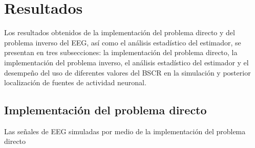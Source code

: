 %
\chapter{Resultados}
\label{sec:results}

Los resultados obtenidos de la implementación del problema directo y del problema inverso del EEG, así como el análisis estadístico del estimador, se presentan en tres subsecciones: la implementación del problema directo, la implementación del problema inverso, el análisis estadístico del estimador y el desempeño del uso de diferentes valores del BSCR en la simulación y posterior localización de fuentes de actividad neuronal.

\section{Implementación del problema directo}
\label{sec:results:direct}

Las señales de EEG simuladas por medio de la implementación del problema directo 
